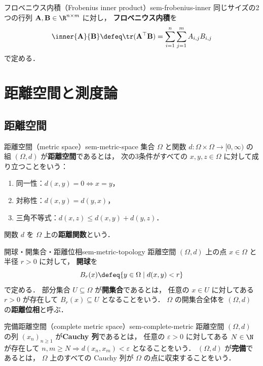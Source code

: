 \begin{definition}{フロベニウス内積（Frobenius inner product）}{sem-frobenius-inner}
  同じサイズの2つの行列 $\mathbf{A}, \mathbf{B} \in \R^{n \times m}$ に対し，
  \textbf{フロベニウス内積}を
  \[
    \inner{\mathbf{A}}{\mathbf{B}}
    \defeq \tr(\mathbf{A}^\top \mathbf{B})
    = \sum_{i=1}^{n} \sum_{j=1}^{m} A_{i,j} B_{i,j}
  \]
  で定める．
\end{definition}

\section{距離空間と測度論}
\label{sec:sem-measure-theory}

\subsection{距離空間}
\label{sec:sem-metric-space}

\begin{definition}{距離空間（metric space）}{sem-metric-space}
  集合 $\Omega$ と関数 $d \colon \Omega \times \Omega \to [0, \infty)$ の組
  $(\Omega, d)$ が\textbf{距離空間}であるとは，
  次の3条件がすべての $x, y, z \in \Omega$ に対して成り立つことをいう：
  \begin{enumerate}
    \item[(i)] 同一性：$d(x, y) = 0 \iff x = y$，
    \item[(ii)] 対称性：$d(x, y) = d(y, x)$，
    \item[(iii)] 三角不等式：$d(x, z) \leq d(x, y) + d(y, z)$．
  \end{enumerate}
  関数 $d$ を $\Omega$ 上の\textbf{距離関数}という．
\end{definition}

\begin{definition}{開球・開集合・距離位相}{sem-metric-topology}
  距離空間 $(\Omega, d)$ 上の点 $x \in \Omega$ と半径 $r > 0$ に対して，
  \textbf{開球}を
  \[
    B_r(x) \defeq \{y \in \Omega \mid d(x, y) < r\}
  \]
  で定める．
  部分集合 $U \subseteq \Omega$ が\textbf{開集合}であるとは，
  任意の $x \in U$ に対してある $r > 0$ が存在して
  $B_r(x) \subseteq U$ となることをいう．
  $\Omega$ の開集合全体を $(\Omega, d)$ の\textbf{距離位相}と呼ぶ．
\end{definition}

\begin{definition}{完備距離空間（complete metric space）}{sem-complete-metric}
  距離空間 $(\Omega, d)$ の列 $(x_n)_{n \geq 1}$ が\textbf{Cauchy 列}であるとは，
  任意の $\varepsilon > 0$ に対してある $N \in \N$ が存在して
  $n, m \geq N \Longrightarrow d(x_n, x_m) < \varepsilon$ となることをいう．
  $(\Omega, d)$ が\textbf{完備}であるとは，
  $\Omega$ 上のすべての Cauchy 列が $\Omega$ の点に収束することをいう．
\end{definition}

